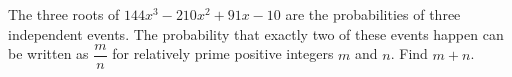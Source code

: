 The three roots of $144x^3-210x^2+91x-10$ are the probabilities of three independent events. The probability that exactly two of these events happen can be written as $\dfrac mn$ for relatively prime positive integers $m$ and $n$. Find $m+n$.
